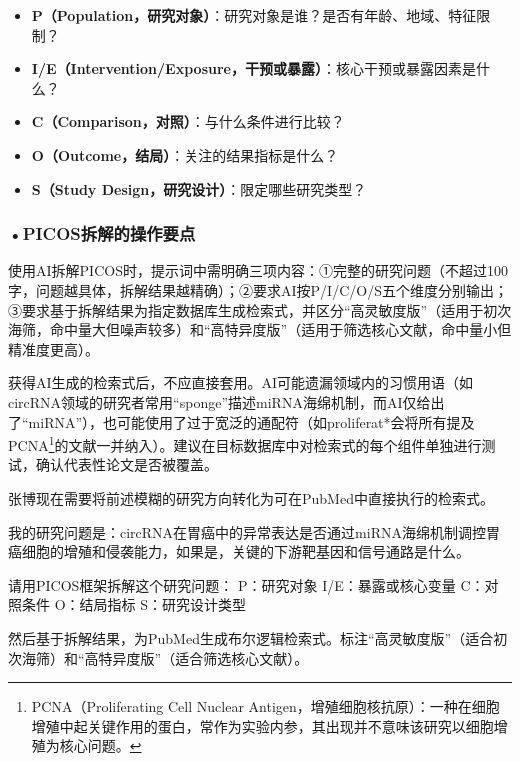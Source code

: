 \begin{tcolorbox}[promptbox]
\begin{itemize}
\setlength{\itemsep}{2pt}
\item \textbf{P（Population，研究对象）}：研究对象是谁？是否有年龄、地域、特征限制？
\item \textbf{I/E（Intervention/Exposure，干预或暴露）}：核心干预或暴露因素是什么？
\item \textbf{C（Comparison，对照）}：与什么条件进行比较？
\item \textbf{O（Outcome，结局）}：关注的结果指标是什么？
\item \textbf{S（Study Design，研究设计）}：限定哪些研究类型？
\end{itemize}
\end{tcolorbox}

\subsubsection*{\textbf{•PICOS拆解的操作要点}}使用AI拆解PICOS时，提示词中需明确三项内容：①完整的研究问题（不超过100字，问题越具体，拆解结果越精确）；②要求AI按P/I/C/O/S五个维度分别输出；③要求基于拆解结果为指定数据库生成检索式，并区分``高灵敏度版''（适用于初次海筛，命中量大但噪声较多）和``高特异度版''（适用于筛选核心文献，命中量小但精准度更高）。

获得AI生成的检索式后，不应直接套用。AI可能遗漏领域内的习惯用语（如circRNA领域的研究者常用``sponge''描述miRNA海绵机制，而AI仅给出了``miRNA''），也可能使用了过于宽泛的通配符（如proliferat*会将所有提及PCNA\footnote{PCNA（Proliferating Cell Nuclear Antigen，增殖细胞核抗原）：一种在细胞增殖中起关键作用的蛋白，常作为实验内参，其出现并不意味该研究以细胞增殖为核心问题。}的文献一并纳入）。建议在目标数据库中对检索式的每个组件单独进行测试，确认代表性论文是否被覆盖。

张博现在需要将前述模糊的研究方向转化为可在PubMed中直接执行的检索式。

\begin{userbox}
我的研究问题是：circRNA在胃癌中的异常表达是否通过miRNA海绵机制调控胃癌细胞的增殖和侵袭能力，如果是，关键的下游靶基因和信号通路是什么。

请用PICOS框架拆解这个研究问题：
P：研究对象  I/E：暴露或核心变量  C：对照条件  O：结局指标  S：研究设计类型

然后基于拆解结果，为PubMed生成布尔逻辑检索式。标注``高灵敏度版''（适合初次海筛）和``高特异度版''（适合筛选核心文献）。
\end{userbox}

